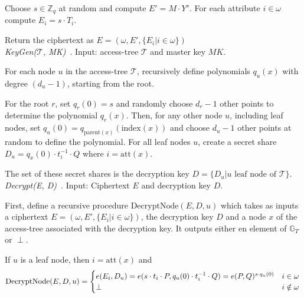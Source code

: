 Choose $s \in \mathbb{Z}_q$ at random and compute $E' = M \cdot Y^s$.
For each attribute $i \in \omega$ compute $E_i = s \cdot T_i$.

Return the ciphertext as $E = (\omega, E', \{E_i | i \in \omega\})$
\\

\noindent \emph{KeyGen($\mathcal{T}$, MK)}~\cite{goyal_attribute-based_2006}.
Input: \gls{access-tree} $\mathcal{T}$ and master key $MK$.

For each node $u$ in the \gls{access-tree} $\mathcal{T}$, recursively define polynomials $q_u(x)$ with degree $(d_u - 1)$, starting from the root.

For the root $r$, set $q_r(0) = s$ and randomly choose $d_r -1$ other points to determine the polynomial $q_r(x)$.
Then, for any other node $u$, including leaf nodes, set $q_u(0) = q_{\text{parent}(x)}(\text{index}(x))$ and choose $d_u -1$ other points at random to define the polynomial. 
For all leaf nodes $u$, create a secret share $D_u = q_x(0) \cdot t_i^{-1} \cdot Q$ where $i = \text{att}(x)$.

The set of these secret shares is the decryption key $D = \{D_u | u \text{ leaf node of } \mathcal{T}\}$.
\\

\noindent \emph{Decrypt(E, D)}~\cite{goyal_attribute-based_2006}.
Input: Ciphertext $E$ and decryption key $D$.

First, define a recursive procedure $\text{DecryptNode}(E, D, u)$ which takes as inputs a ciphertext $E = (\omega, E', \{E_i | i \in \omega\})$, the decryption key $D$ and a node $x$ of the \gls{access-tree} associated with the decryption key.
It outputs either en element of $\mathbb{G}_T$ or $\perp$.

If $u$ is a leaf node, then $i = \text{att}(x)$ and 
\begin{equation*}
    \text{DecryptNode}(E, D, u) = \begin{cases}
        e(E_i, D_u) = e(s \cdot t_i \cdot P, q_u(0) \cdot t_i^{-1} \cdot Q) = e(P, Q)^{s\cdot q_u(0)} & i \in \omega\\
        \perp & i \notin \omega
    \end{cases}\\
\end{equation*}

